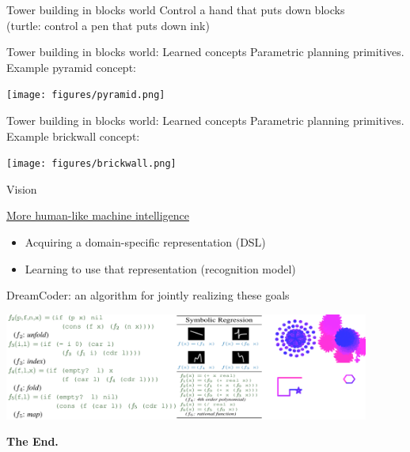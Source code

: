 \documentclass{beamer}
\begin{document}
\begin{frame}{Tower building in blocks world}
  \large
\centering  
  Control a hand that puts down blocks \\
  \hspace{1cm}(turtle: control a pen that puts down ink)
  

  \end{frame}

\begin{frame}{Tower building in blocks world: Learned concepts}
  Parametric planning primitives. Example pyramid concept:

  \texttt{[image: figures/pyramid.png]}

\end{frame}

\begin{frame}{Tower building in blocks world: Learned concepts}
  Parametric planning primitives. Example brickwall concept:

  \texttt{[image: figures/brickwall.png]} 

\end{frame}


\begin{frame}{Vision}


   \underline{More human-like machine intelligence}\\%
   \begin{itemize}
   \item    Acquiring a domain-specific representation (DSL)
     \item Learning  to use that representation (recognition model)
   \end{itemize}
   DreamCoder: an algorithm for jointly realizing these goals

   



   \hspace{-1cm}\includegraphics[width = 12cm]{figures/finale.png}

   \pause

   \Huge \centering \textbf{The End.}
  \end{frame}
\end{document}
